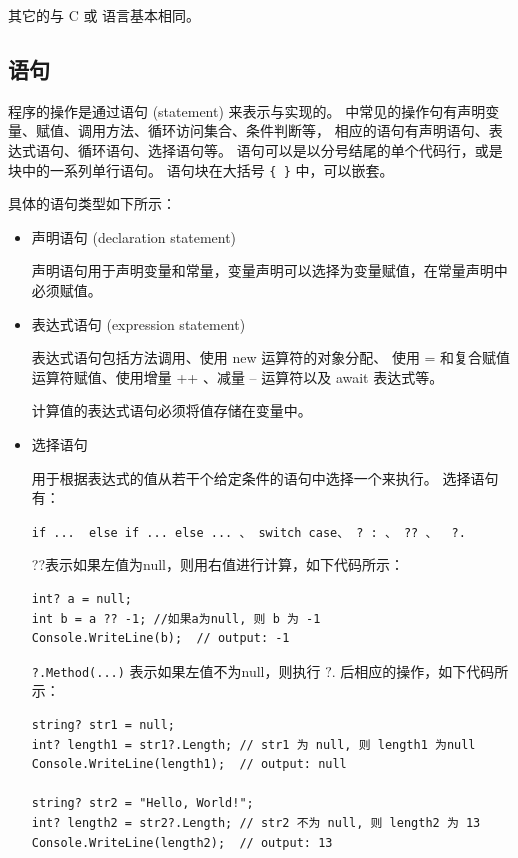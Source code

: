 其它的与 C 或 \cpp 语言基本相同。

\subsection{ 语句 }
程序的操作是通过语句 (statement) 来表示与实现的。
\cs 中常见的操作句有声明变量、赋值、调用方法、循环访问集合、条件判断等，
相应的语句有声明语句、表达式语句、循环语句、选择语句等。
语句可以是以分号结尾的单个代码行，或是块中的一系列单行语句。
语句块在大括号 \verb|{ }| 中，可以嵌套。

具体的语句类型如下所示：

\begin{itemize}
    \item 声明语句 (declaration statement)

          声明语句用于声明变量和常量，变量声明可以选择为变量赋值，在常量声明中必须赋值。

    \item 表达式语句 (expression statement)

          表达式语句包括方法调用、使用 new 运算符的对象分配、
          使用 = 和复合赋值运算符赋值、使用增量 ++ 、减量 -- 运算符以及 await 表达式等。

          计算值的表达式语句必须将值存储在变量中。

    \item 选择语句

          用于根据表达式的值从若干个给定条件的语句中选择一个来执行。
          选择语句有：

          \verb|if ...  else if ... else ... 、 switch case、 ? : 、 ?? 、  ?. |

          ??表示如果左值为null，则用右值进行计算，如下代码所示：

          \begin{lstlisting}
int? a = null;
int b = a ?? -1; //如果a为null, 则 b 为 -1
Console.WriteLine(b);  // output: -1
\end{lstlisting}

          \verb|?.Method(...)| 表示如果左值不为null，则执行 $ ?. $ 后相应的操作，如下代码所示：

          \begin{lstlisting}
string? str1 = null;
int? length1 = str1?.Length; // str1 为 null, 则 length1 为null
Console.WriteLine(length1);  // output: null

string? str2 = "Hello, World!";
int? length2 = str2?.Length; // str2 不为 null, 则 length2 为 13
Console.WriteLine(length2);  // output: 13
\end{lstlisting}


\end{itemize}
